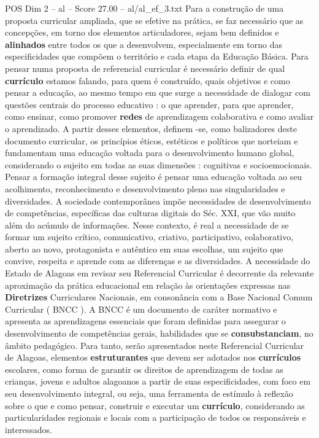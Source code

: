 \begin{textsample}{POS Dim 2 – al – Score 27.00 – al/al\_ef\_3.txt}
Para a construção de uma proposta curricular ampliada, que se efetive na prática, se faz necessário que as concepções, em torno dos elementos articuladores, sejam bem definidos e \textbf{alinhados} entre todos os que a desenvolvem, especialmente em torno das especificidades que compõem o território e cada etapa da Educação Básica.
Para pensar numa proposta de referencial curricular é necessário definir de qual \textbf{currículo} estamos falando, para quem é construído, quais objetivos e como pensar a educação, ao mesmo tempo em que surge a necessidade de dialogar com questões centrais do processo educativo : o que aprender, para que aprender, como ensinar, como promover \textbf{redes} de aprendizagem colaborativa e como avaliar o aprendizado.
A partir desses elementos, definem -se, como balizadores deste documento curricular, os princípios éticos, estéticos e políticos que norteiam e fundamentam uma educação voltada para o desenvolvimento humano global, considerando o sujeito em todas as suas dimensões : cognitivas e socioemocionais.
Pensar a formação integral desse sujeito é pensar uma educação voltada ao seu acolhimento, reconhecimento e desenvolvimento pleno nas singularidades e diversidades.
A sociedade contemporânea impõe necessidades de desenvolvimento de competências, específicas das culturas digitais do Séc.
XXI, que vão muito além do acúmulo de informações.
Nesse contexto, é real a necessidade de se formar um sujeito crítico, comunicativo, criativo, participativo, colaborativo, aberto ao novo, protagonista e autêntico em suas escolhas, um sujeito que convive, respeita e aprende com as diferenças e as diversidades.
A necessidade do Estado de Alagoas em revisar seu Referencial Curricular é decorrente da relevante aproximação da prática educacional em relação às orientações expressas nas \textbf{Diretrizes} Curriculares Nacionais, em consonância com a Base Nacional Comum Curricular ( BNCC ).
A BNCC é um documento de caráter normativo e apresenta as aprendizagens essenciais que foram definidas para assegurar o desenvolvimento de competências gerais, habilidades que se \textbf{consubstanciam}, no âmbito pedagógico.
Para tanto, serão apresentados neste Referencial Curricular de Alagoas, elementos \textbf{estruturantes} que devem ser adotados nos \textbf{currículos} escolares, como forma de garantir os direitos de aprendizagem de todas as crianças, jovens e adultos alagoanos a partir de suas especificidades, com foco em seu desenvolvimento integral, ou seja, uma ferramenta de estímulo à reflexão sobre o que e como pensar, construir e executar um \textbf{currículo}, considerando as particularidades regionais e locais com a participação de todos os responsáveis e interessados.

\end{textsample}
